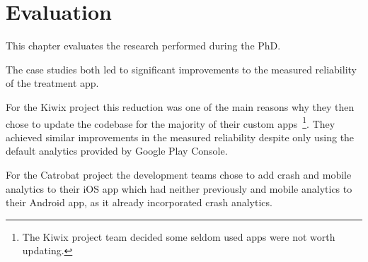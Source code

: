 \chapter{Evaluation}
This chapter evaluates the research performed during the PhD.

The case studies both led to significant improvements to the measured reliability of the treatment app. 

For the Kiwix project this reduction was one of the main reasons why they then chose to update the codebase for the majority of their custom apps~\footnote{The Kiwix project team decided some seldom used apps were not worth updating.}. They achieved similar improvements in the measured reliability despite only using the default analytics provided by Google Play Console. 

For the Catrobat project the development teams chose to add crash and mobile analytics to their iOS app which had neither previously and mobile analytics to their Android app, as it already incorporated crash analytics.

